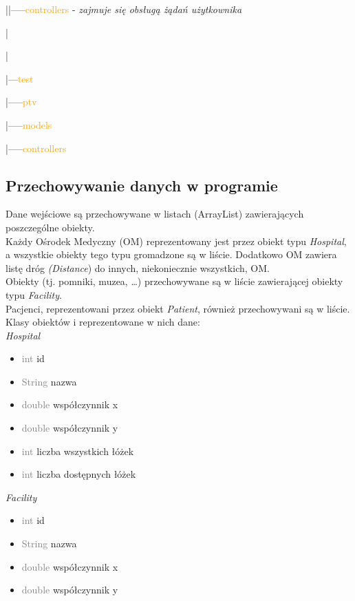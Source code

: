 \documentclass[]{article}
\begin{document}
    |\hspace{15mm}|-----\textcolor{orange}{controllers} -\textit{ zajmuje się obsługą żądań użytkownika}

    |

    |

    |---\textcolor{orange}{test}

    \hspace{5mm} |-----\textcolor{orange}{ptv}

    \hspace{16mm}|-----\textcolor{orange}{models}

    \hspace{16mm}|-----\textcolor{orange}{controllers}

    \subsection{Przechowywanie danych w programie}
    Dane wejściowe są przechowywane w listach (ArrayList) zawierających poszczególne obiekty. \\
    Każdy Ośrodek Medyczny (OM) reprezentowany jest przez obiekt typu\textit{ Hospital}, a wszystkie obiekty tego typu gromadzone są w liście. Dodatkowo OM zawiera listę dróg \textit{(Distance}) do innych, niekoniecznie wszystkich, OM.\\
    Obiekty (tj. pomniki, muzea, \ldots) przechowywane są w liście zawierającej obiekty typu \textit{Facility}.\\
    Pacjenci, reprezentowani przez obiekt \textit{Patient}, również przechowywani są w liście.\\

    Klasy obiektów i reprezentowane w nich dane:\\


    \textit{Hospital}
    \begin{itemize}
        \item  \textcolor{gray}{int} id
        \item  \textcolor{gray}{String} nazwa
        \item  \textcolor{gray}{double} współczynnik x
        \item \textcolor{gray}{double}  współczynnik y
        \item \textcolor{gray}{int}  liczba wszystkich łóżek
        \item \textcolor{gray}{int}  liczba dostępnych łóżek
    \end{itemize}

    \textit{Facility}
    \begin{itemize}
        \item  \textcolor{gray}{int} id
        \item  \textcolor{gray}{String}  nazwa
        \item  \textcolor{gray}{double}  współczynnik x
        \item \textcolor{gray}{double}  współczynnik y
    \end{itemize}
\end{document}
